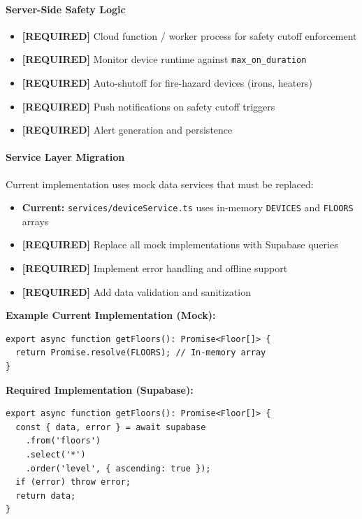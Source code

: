 \documentclass[12pt,a4paper]{article}
\begin{document}
\paragraph{Server-Side Safety Logic}
\begin{itemize}[leftmargin=*]
    \item \textcolor{required}{\textbf{[REQUIRED]}} Cloud function / worker process for safety cutoff enforcement
    \item \textcolor{required}{\textbf{[REQUIRED]}} Monitor device runtime against \texttt{max\_on\_duration}
    \item \textcolor{required}{\textbf{[REQUIRED]}} Auto-shutoff for fire-hazard devices (irons, heaters)
    \item \textcolor{required}{\textbf{[REQUIRED]}} Push notifications on safety cutoff triggers
    \item \textcolor{required}{\textbf{[REQUIRED]}} Alert generation and persistence
\end{itemize}

\paragraph{Service Layer Migration}
Current implementation uses mock data services that must be replaced:
\begin{itemize}[leftmargin=*]
    \item \textbf{Current:} \texttt{services/deviceService.ts} uses in-memory \texttt{DEVICES} and \texttt{FLOORS} arrays
    \item \textcolor{required}{\textbf{[REQUIRED]}} Replace all mock implementations with Supabase queries
    \item \textcolor{required}{\textbf{[REQUIRED]}} Implement error handling and offline support
    \item \textcolor{required}{\textbf{[REQUIRED]}} Add data validation and sanitization
\end{itemize}

\textbf{Example Current Implementation (Mock):}
\begin{verbatim}
export async function getFloors(): Promise<Floor[]> {
  return Promise.resolve(FLOORS); // In-memory array
}
\end{verbatim}

\textbf{Required Implementation (Supabase):}
\begin{verbatim}
export async function getFloors(): Promise<Floor[]> {
  const { data, error } = await supabase
    .from('floors')
    .select('*')
    .order('level', { ascending: true });
  if (error) throw error;
  return data;
}
\end{verbatim}
\end{document}
